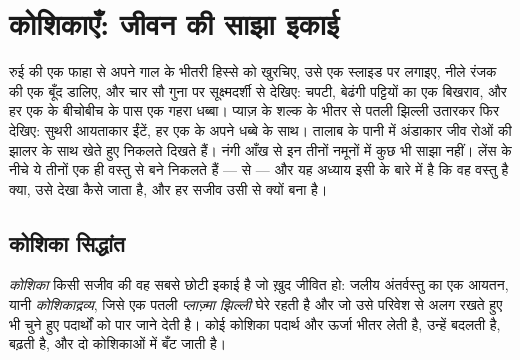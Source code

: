 \chapter{कोशिकाएँ: जीवन की साझा इकाई}\label{ch:g10:cells-common-unit}

रुई की एक फाहा से अपने गाल के भीतरी हिस्से को खुरचिए, उसे एक स्लाइड पर
लगाइए, नीले रंजक की एक बूँद डालिए, और चार सौ गुना पर सूक्ष्मदर्शी से
देखिए: चपटी, बेढंगी पट्टियों का एक बिखराव, और हर एक के बीचोबीच के पास एक
गहरा धब्बा। प्याज़ के शल्क के भीतर से पतली झिल्ली उतारकर फिर देखिए:
सुथरी आयताकार ईंटें, हर एक के अपने धब्बे के साथ। तालाब के पानी में
अंडाकार जीव रोओं की झालर के साथ खेते हुए निकलते दिखते हैं। नंगी आँख से
इन तीनों नमूनों में कुछ भी साझा नहीं। लेंस के नीचे ये तीनों एक ही वस्तु
से बने निकलते हैं ---  से --- और यह अध्याय इसी के बारे में है कि
वह वस्तु है क्या, उसे देखा कैसे जाता है, और हर सजीव उसी से क्यों बना है।

\section{कोशिका सिद्धांत}

\begin{definition}[कोशिका]\label{def:g10:cells-common-unit:cell}
\emph{कोशिका} किसी सजीव की वह सबसे छोटी इकाई है जो ख़ुद
जीवित हो: जलीय अंतर्वस्तु का एक आयतन, यानी
\emph{कोशिकाद्रव्य}, जिसे एक पतली
\emph{प्लाज़्मा झिल्ली} घेरे रहती है और जो उसे
परिवेश से अलग रखते हुए भी चुने हुए पदार्थों को पार जाने देती है। कोई
कोशिका पदार्थ और ऊर्जा भीतर लेती है, उन्हें बदलती है, बढ़ती है, और दो
कोशिकाओं में बँट जाती है।
\end{definition}

